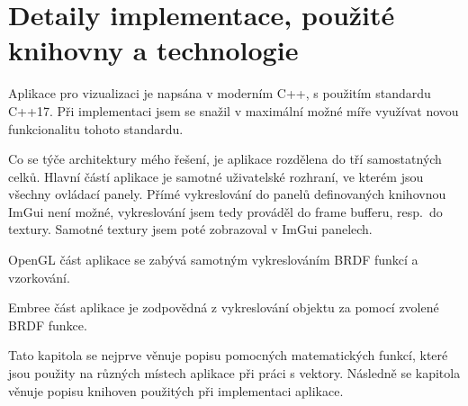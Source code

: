 \documentclass[czech,master]{diploma}
\begin{document}
\section{Detaily implementace, použité knihovny a technologie}
Aplikace pro vizualizaci je napsána v moderním C++, s použitím standardu C++17. Při implementaci jsem se snažil v maximální možné míře využívat novou funkcionalitu tohoto standardu. \par
Co se týče architektury mého řešení, je aplikace rozdělena do tří samostatných celků. Hlavní částí aplikace je samotné uživatelské rozhraní, ve kterém jsou všechny ovládací panely. Přímé vykreslování do panelů definovaných knihovnou ImGui není možné, vykreslování jsem tedy prováděl do frame bufferu, resp.\ do textury. Samotné textury jsem poté zobrazoval v ImGui panelech. \par
OpenGL část aplikace se zabývá samotným vykreslováním BRDF funkcí a vzorkování. \par
Embree část aplikace je zodpovědná z vykreslování objektu za pomocí zvolené BRDF funkce.\par
Tato kapitola se nejprve věnuje popisu pomocných matematických funkcí, které jsou použity na různých místech aplikace při práci s vektory. Následně se kapitola věnuje popisu knihoven použitých při implementaci aplikace.
\end{document}
